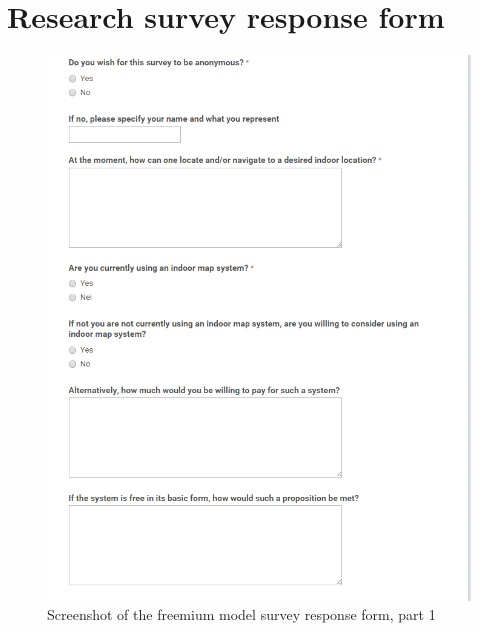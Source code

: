 \chapter{Research survey response form}
\begin{figure}
\centering
\includegraphics[width=\linewidth]{figs/questionaire1.PNG}
\caption{Screenshot of the freemium model survey response form, part 1}
\label{fig:surveyform1}
\end{figure}

